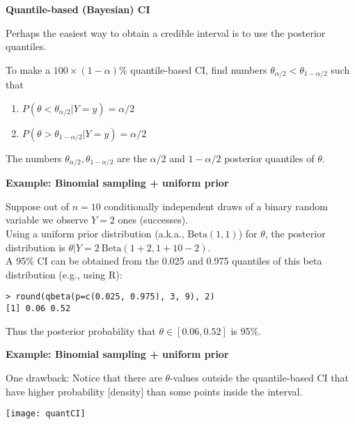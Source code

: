 \documentclass[12pt,xcolor=svgnames]{beamer}
\newcommand{\bl}{\color{blue}}
\newcommand{\theme}{\color{FireBrick}}
\newcommand{\mr}[1]{\mathrm{#1}}
\newcommand{\sk}{\vspace{.4cm}}
\newcommand{\chap}[1]{{\theme \Large \bf #1} \sk}
\begin{document}
\begin{frame}
\chap{Quantile-based (Bayesian) CI}

Perhaps the easiest way to obtain a credible interval is to use the posterior quantiles.

To make a $100 \times (1-\alpha)$\% quantile-based CI, find numbers $\theta_{\alpha/2}<\theta_{1- \alpha/2}$ such that
\begin{enumerate}
\item $P(\theta <\theta_{\alpha/2} |Y=y)=\alpha/2$
\item $P(\theta >\theta_{1-\alpha/2} |Y=y)=\alpha/2$
\end{enumerate}
The numbers $\theta_{\alpha/2},\theta_{1- \alpha/2}$ are the $\alpha/2$ and  $1-\alpha/2$ posterior quantiles of $\theta$.\\

\end{frame}


\begin{frame}[fragile]
\chap{Example: Binomial sampling + uniform prior}

Suppose out of $n=10$ conditionally independent draws of a binary random variable we observe $Y=2$ ones (successes). \\

\sk
Using a uniform prior distribution (a.k.a., $\mr{Beta}(1,1)$) for $\theta$, the posterior distribution is $\theta | Y=2 ~ \mr{Beta}(1+2,1+10-2)$. \\

\sk
A 95\% CI can be obtained from the 0.025 and 0.975 quantiles of this beta distribution (e.g., using {\sf R}):\\
{\bl \footnotesize
\begin{verbatim}
> round(qbeta(p=c(0.025, 0.975), 3, 9), 2)
[1] 0.06 0.52
\end{verbatim}
}
Thus the posterior probability that $\theta \in [0.06, 0.52]$ is 95\%. 
\end{frame}


\begin{frame}[fragile]
\chap{Example: Binomial sampling + uniform prior}

One drawback: Notice that there are $\theta$-values outside the quantile-based CI that have higher probability [density] than some points inside the interval.

\begin{center}
\texttt{[image: quantCI]}
\end{center}

\end{frame}
\end{document}
